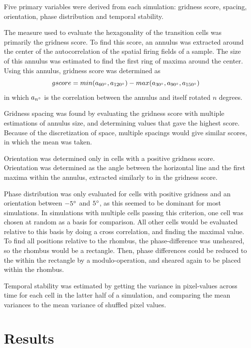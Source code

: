 \documentclass{article}
\begin{document}
    Five primary variables were derived from each simulation: gridness score, spacing, orientation, phase distribution and temporal stability.
    
    The measure used to evaluate the hexagonality of the transition cells was primarily the gridness score. To find this score, an annulus was extracted around the center of the autocorrelation of the spatial firing fields of a sample. The size of this annulus was estimated to find the first ring of maxima around the center. Using this annulus, gridness score was determined as \[gscore = min(a_{60\degree}, a_{120\degree}) - max(a_{30\degree}, a_{90\degree}, a_{150\degree})\] in which \(a_{n\degree}\) is the correlation between the annulus and itself rotated \(n\) degrees.

    Gridness spacing was found by evaluating the gridness score with multiple estimations of annulus size, and determining values that gave the highest score. Because of the discretization of space, multiple spacings would give similar scores, in which the mean was taken.

    Orientation was determined only in cells with a positive gridness score. Orientation was determined as the angle between the horizontal line and the first maxima within the annulus, extracted similarly to in the gridness score.

    Phase distribution was only evaluated for cells with positive gridness and an orientation between \(-5\degree\) and \(5\degree\), as this seemed to be dominant for most simulations. In simulations with multiple cells passing this criterion, one cell was chosen at random as a basis for comparison. All other cells would be evaluated relative to this basis by doing a cross correlation, and finding the maximal value. To find all positions relative to the rhombus, the phase-difference was unsheared, so the rhombus would be a rectangle. Then, phase differences could be reduced to the within the rectangle by a modulo-operation, and sheared again to be placed within the rhombus.
    
    Temporal stability was estimated by getting the variance in pixel-values across time for each cell in the latter half of a simulation, and comparing the mean variances to the mean variance of shuffled pixel values. 


    \section{Results}
\end{document}
